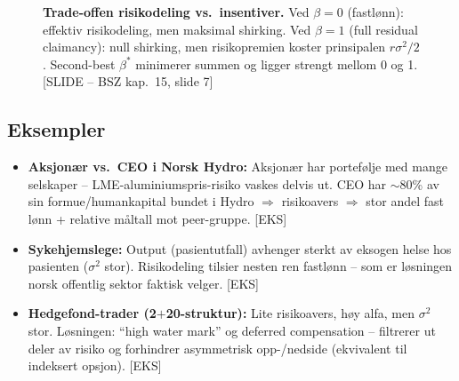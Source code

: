 \begin{figure}[H]
\centering
{}
\caption{\textbf{Trade-offen risikodeling vs.\ insentiver.} Ved $\beta = 0$ (fastlønn): effektiv risikodeling, men maksimal shirking. Ved $\beta = 1$ (full residual claimancy): null shirking, men risikopremien koster prinsipalen $r\sigma^2/2$. Second-best $\beta^*$ minimerer summen og ligger strengt mellom 0 og 1. [SLIDE -- BSZ kap.\ 15, slide 7]}
\end{figure}

\subsection*{Eksempler}
\begin{itemize}\setlength{\itemsep}{2pt}
\item \textbf{Aksjonær vs.\ CEO i Norsk Hydro:} Aksjonær har portefølje med mange selskaper -- LME-aluminiumspris-risiko vaskes delvis ut. CEO har $\sim 80$\% av sin formue/humankapital bundet i Hydro $\Rightarrow$ risikoavers $\Rightarrow$ stor andel fast lønn + relative måltall mot peer-gruppe. [EKS]
\item \textbf{Sykehjemslege:} Output (pasientutfall) avhenger sterkt av eksogen helse hos pasienten ($\sigma^{2}$ stor). Risikodeling tilsier nesten ren fastlønn -- som er løsningen norsk offentlig sektor faktisk velger. [EKS]
\item \textbf{Hedgefond-trader (2$+$20-struktur):} Lite risikoavers, høy alfa, men $\sigma^{2}$ stor. Løsningen: ``high water mark'' og deferred compensation -- filtrerer ut deler av risiko og forhindrer asymmetrisk opp-/nedside (ekvivalent til indeksert opsjon). [EKS]
\end{itemize}

